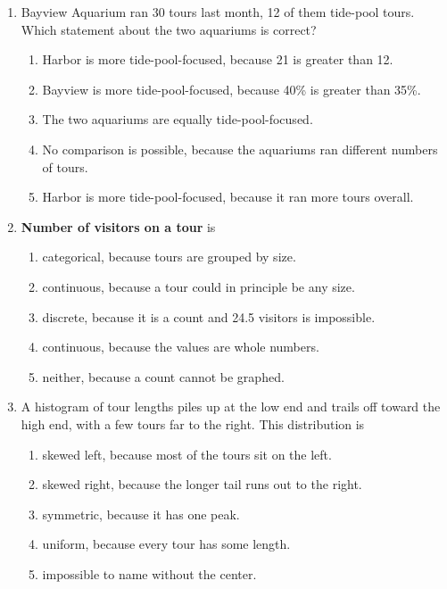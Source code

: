 \documentclass[12pt]{article}
\newcommand{\letterroom}{\rule[-15pt]{0pt}{36pt}}
\begin{document}
\begin{enumerate}[leftmargin=1.9em, itemsep=0.13in]
  \boxguard[9]
  \item Bayview Aquarium ran 30 tours last month, 12 of them tide-pool tours. Which statement
        about the two aquariums is correct?
        \begin{enumerate}[label=\textbf{(\Alph*)}, leftmargin=2.2em, itemsep=2pt]
          \item Harbor is more tide-pool-focused, because 21 is greater than 12.
          \item Bayview is more tide-pool-focused, because 40\% is greater than 35\%.
          \item The two aquariums are equally tide-pool-focused.
          \item No comparison is possible, because the aquariums ran different numbers of tours.
          \item Harbor is more tide-pool-focused, because it ran more tours overall.
                \hfill{}\letterroom
        \end{enumerate}

  \boxguard[9]
  \item \textbf{Number of visitors on a tour} is
        \begin{enumerate}[label=\textbf{(\Alph*)}, leftmargin=2.2em, itemsep=2pt]
          \item categorical, because tours are grouped by size.
          \item continuous, because a tour could in principle be any size.
          \item discrete, because it is a count and 24.5 visitors is impossible.
          \item continuous, because the values are whole numbers.
          \item neither, because a count cannot be graphed.
                \hfill{}\letterroom
        \end{enumerate}

  \boxguard[9]
  \item A histogram of tour lengths piles up at the low end and trails off toward the high end,
        with a few tours far to the right. This distribution is
        \begin{enumerate}[label=\textbf{(\Alph*)}, leftmargin=2.2em, itemsep=2pt]
          \item skewed left, because most of the tours sit on the left.
          \item skewed right, because the longer tail runs out to the right.
          \item symmetric, because it has one peak.
          \item uniform, because every tour has some length.
          \item impossible to name without the center.
                \hfill{}\letterroom
        \end{enumerate}


\end{enumerate}
\end{document}
